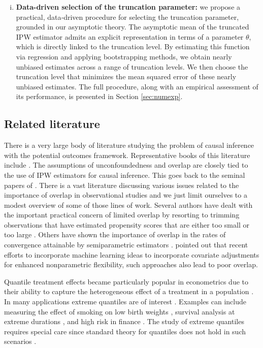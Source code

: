 \documentclass[12pt]{amsart}
\newcommand{\1}{\mathbbm{1}}
\newcommand{\0}{\mathbf{0}}
\theoremstyle{plain}
\theoremstyle{definition}
\begin{document}
\begin{enumerate}[(i)]
    \item 
     \textbf{Data-driven selection of the truncation parameter:} we propose a practical, data‑driven procedure for selecting the truncation parameter, grounded in our asymptotic theory. The asymptotic  mean of the truncated IPW estimator admits an explicit representation in terms of a parameter $\theta$, which is directly linked to the truncation level. By estimating this function via  regression and applying bootstrapping methods, we obtain nearly unbiased estimates across a range of truncation levels. We then choose the truncation level that minimizes the mean squared error of these nearly unbiased estimates. The full procedure, along with an empirical assessment of its performance, is presented in Section \ref{sec:numexp}.  
\end{enumerate}

\subsection{Related literature}

There is a very large body of literature studying the problem of causal inference with the potential outcomes framework. Representative books of this literature include \cite{imbens:rubin2015,rosenbaum2017,ding2024}. The assumptions of unconfoundedness and overlap are closely  tied to the use of IPW estimators for causal inference. This goes back to the seminal papers of \cite{rubin1974, rosenbaum:rubin1983,robins:rotnitzky:zhao1994}. There is a vast literature discussing various issues related to the importance  of overlap in observational studies and we just limit ourselves to a modest overview of some of those lines of work. Several authors have dealt with the important practical concern of limited overlap  by resorting to trimming observations that have estimated propensity scores that are either too small or too large \cite{dehejia:wahba1999,crump:hotz:imbens:mitnik2009,busso:dinardo:mccrary2014,yang:ding2018, matsouaka:zhou2024,liu:li:zhou:matsouaka2024}. Others have shown the importance of overlap  in the rates of convergence attainable by semiparametric estimators \cite{khan:tamer2010,ma:wang2020,armstrong:kolesar2021,khan:nekipelov2022}. \cite{damour:ding:feller:lei:jasjeet2021} pointed out that recent efforts to incorporate machine learning ideas to incorporate covariate adjustments for enhanced nonparametric flexibility, such approaches also lead to poor overlap.

Quantile treatment effects became  particularly popular in econometrics due to their ability to capture the heterogeneous effect of a   treatment in  a population \cite{abadie:angrist:imbens2002,chernozhukov:hansen2006,firpo2007}. In many applications extreme quantiles are of interest \cite{chernozhukov2005,zhang2018}. Examples can include measuring the effect of smoking on low birth weights \cite{abrevaya:dahl2008}, survival analysis at extreme durations \cite{koenker:geling2001}, and high risk in finance \cite{tsay2005}. The study of extreme quantiles requires special care since standard theory for quantiles does not hold in such scenarios \cite{chernozhukov2005,wang:li:he2012,wang:li2013, zhang2018,deuber:lo:engelke:maathuis2023}.
\end{document}
